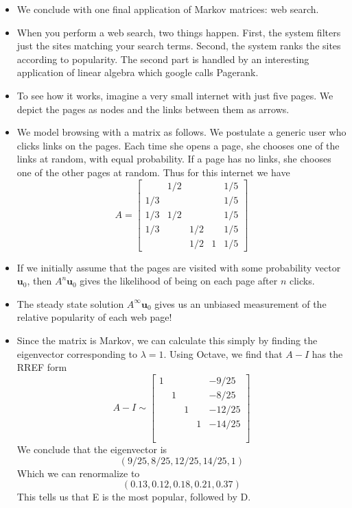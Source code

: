 \documentclass[11pt,oneside]{amsbook}
\theoremstyle{definition}
\theoremstyle{plain}
\theoremstyle{definition}
\theoremstyle{remark}
\numberwithin{equation}{section}
\numberwithin{figure}{section}
\begin{document}
\begin{itemize}
\item We conclude with one final application of Markov matrices: web search.
\item When you perform a web search, two things happen. First, the system filters just the sites matching your search terms. Second, the system ranks the sites according to popularity. The second part is handled by an interesting application of linear algebra which google calls Pagerank.
\item To see how it works, imagine a very small internet with just five pages. We depict the pages as nodes and the links between them as arrows.
  \begin{center}
  \end{center}
\item We model browsing with a matrix as follows. We postulate a generic user who clicks links on the pages. Each time she opens a page, she chooses one of the links at random, with equal probability. If a page has no links, she chooses one of the other pages at random. Thus for this internet we have
  \[A=\begin{bmatrix}
      &1/2&&&1/5\\
      1/3&&&&1/5\\
      1/3&1/2&&&1/5\\
      1/3&&1/2&&1/5\\
      &&1/2&1&1/5
    \end{bmatrix}
  \]
\item If we initially assume that the pages are visited with some probability vector $\mathbf{u}_0$, then $A^n\mathbf{u}_0$ gives the likelihood of being on each page after $n$ clicks.
\item The steady state solution $A^\infty\mathbf{u}_0$ gives us an unbiased measurement of the relative popularity of each web page!
\item Since the matrix is Markov, we can calculate this simply by finding the eigenvector corresponding to $\lambda=1$. Using Octave, we find that $A-I$ has the RREF form
  \[A-I\sim\begin{bmatrix}
      1&&&&-9/25\\
      &1&&&-8/25\\
      &&1&&-12/25\\
      &&&1&-14/25\\
      \phantom{1}
    \end{bmatrix}
  \]
  We conclude that the eigenvector is
  \[(9/25,8/25,12/25,14/25,1)
  \]
  Which we can renormalize to
  \[(0.13,0.12,0.18,0.21,0.37)
  \]
  This tells us that E is the most popular, followed by D.
\end{itemize}
\end{document}
